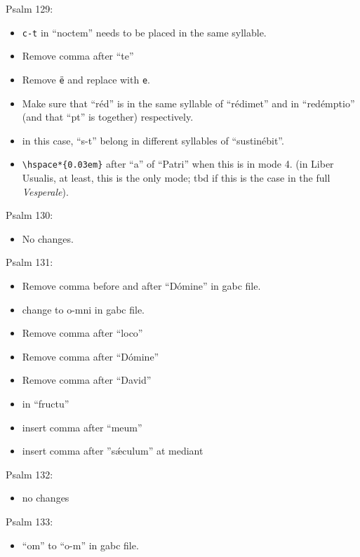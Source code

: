 \documentclass[11pt]{article}
\begin{document}
  Psalm 129:
  \begin{itemize}
  \item  \texttt{c-t} in ``noctem'' needs to be placed in the same syllable.
    \item Remove comma after ``te''
  \item Remove \texttt{ë} and replace with \texttt{e}.
    \item Make sure that ``réd'' is in the same syllable of ``rédimet'' and in ``redémptio'' (and that ``pt'' is together) respectively.
   \item in this case, ``s-t'' belong in different syllables of ``sustinébit''.
    \item \verb|\hspace*{0.03em}| after ``a'' of ``Patri'' when this is in mode 4. (in Liber Usualis, at least, this is the only mode; tbd if this is the case in the full \textit{Vesperale}).
 
  \end{itemize}
  
  Psalm 130:
  \begin{itemize}
  \item 
No changes.
    \end{itemize}
  
      Psalm 131:
  \begin{itemize}
  \item Remove comma before and after ``Dómine'' in gabc file.
  \item
 change to o-mni  in gabc file.
  \item   Remove comma after ``loco''
  \item
  Remove comma after ``Dómine''
    \item
  Remove comma after ``David''
  \item
 \verb|| in ``fructu''
 \item insert comma after ``meum''
 \item insert comma after ''sǽculum'' at mediant
    \end{itemize}

Psalm 132:
  \begin{itemize}
  \item 
no changes
    \end{itemize}

 Psalm 133:
  \begin{itemize}
  \item 
``om'' to ``o-m'' in gabc file.
    \end{itemize}
\end{document}
